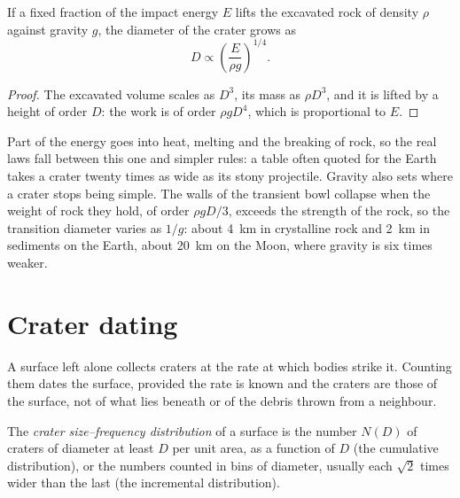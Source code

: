 \begin{proposition}\label{prop:b3:planetary-interiors-surfaces:scaling}
If a fixed fraction of the impact energy $E$ lifts the excavated rock of
density $\rho$ against gravity $g$, the diameter of the crater grows as
\[
  D \propto \left(\frac{E}{\rho g}\right)^{1/4} .
\]
\end{proposition}

\begin{proof}
The excavated volume scales as $D^3$, its mass as $\rho D^3$, and it is
lifted by a height of order $D$: the work is of order $\rho g D^4$, which
is proportional to $E$.
\end{proof}

Part of the energy goes into heat, melting and the breaking of rock, so
the real laws fall between this one and simpler rules: a table often
quoted for the Earth takes a crater twenty times as wide as its stony
projectile. Gravity also sets where a crater stops being simple. The
walls of the transient bowl collapse when the weight of rock they hold,
of order $\rho g D/3$, exceeds the strength of the rock, so the
transition diameter varies as $1/g$: about \qty{4}{km} in crystalline
rock and \qty{2}{km} in sediments on the Earth, about \qty{20}{km} on the
Moon, where gravity is six times weaker.

\section{Crater dating}\label{sec:b3:planetary-interiors-surfaces:dating}

A surface left alone collects craters at the rate at which bodies strike
it. Counting them dates the surface, provided the rate is known and the
craters are those of the surface, not of what lies beneath or of the
debris thrown from a neighbour.

\begin{definition}\label{def:b3:planetary-interiors-surfaces:sfd}
The \emph{crater size--frequency distribution}
of a surface is the number $N(D)$ of craters of diameter at least $D$ per
unit area, as a function of $D$ (the cumulative distribution), or the
numbers counted in bins of diameter, usually each $\sqrt2$ times wider
than the last (the incremental distribution).
\end{definition}

